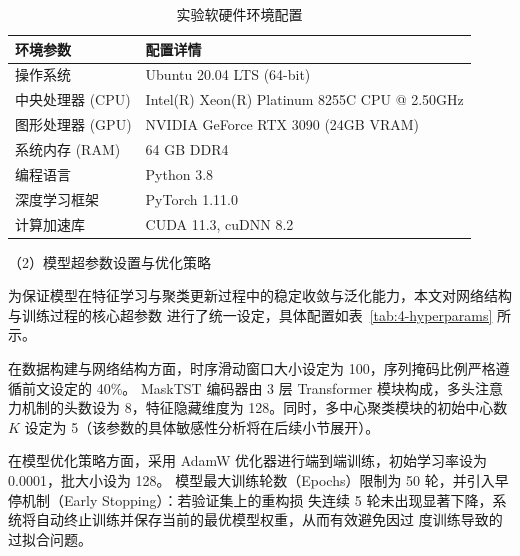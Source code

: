 \begin{table}[htbp]
    \centering
    \caption{实验软硬件环境配置}
    \label{tab:4-env}
    \begin{tabular}{ll}
        \toprule
        \textbf{环境参数} & \textbf{配置详情} \\
        \midrule
        操作系统 & Ubuntu 20.04 LTS (64-bit) \\
        中央处理器 (CPU) & Intel(R) Xeon(R) Platinum 8255C CPU @ 2.50GHz \\
        图形处理器 (GPU) & NVIDIA GeForce RTX 3090 (24GB VRAM) \\
        系统内存 (RAM) & 64 GB DDR4 \\
        编程语言 & Python 3.8 \\
        深度学习框架 & PyTorch 1.11.0 \\
        计算加速库 & CUDA 11.3, cuDNN 8.2 \\
        \bottomrule
    \end{tabular}
\end{table}

（2）模型超参数设置与优化策略

为保证模型在特征学习与聚类更新过程中的稳定收敛与泛化能力，本文对网络结构与训练过程的核心超参数
进行了统一设定，具体配置如表~\ref{tab:4-hyperparams} 所示。

在数据构建与网络结构方面，时序滑动窗口大小设定为 100，序列掩码比例严格遵循前文设定的 40\%。
MaskTST 编码器由 3 层 Transformer 模块构成，多头注意力机制的头数设为 8，特征隐藏维度为 
128。同时，多中心聚类模块的初始中心数 $K$ 设定为 5（该参数的具体敏感性分析将在后续小节展开）。

在模型优化策略方面，采用 AdamW 优化器进行端到端训练，初始学习率设为 0.0001，批大小设为 128。
模型最大训练轮数（Epochs）限制为 50 轮，并引入早停机制（Early Stopping）：若验证集上的重构损
失连续 5 轮未出现显著下降，系统将自动终止训练并保存当前的最优模型权重，从而有效避免因过
度训练导致的过拟合问题。


